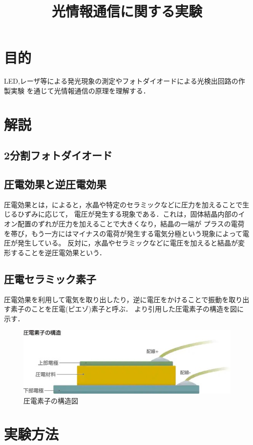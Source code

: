 \documentclass{ltjsarticle}
\title{光情報通信に関する実験}
\begin{document}
\maketitle

\section{目的}
	LED,レーザ等による発光現象の測定やフォトダイオードによる光検出回路の作製実験
	を通じて光情報通信の原理を理解する．

\section{解説}
	\subsection{2分割フォトダイオード}
	\subsection{圧電効果と逆圧電効果}
		圧電効果とは，\cite{ref:圧電効果}によると，水晶や特定のセラミックなどに圧力を加えることで生じるひずみに応じて，
		電圧が発生する現象である．これは，固体結晶内部のイオン配置のずれが圧力を加えることで大きくなり，結晶の一端が
		プラスの電荷を帯び，もう一方にはマイナスの電荷が発生する電気分極という現象によって電圧が発生している。
		反対に，水晶やセラミックなどに電圧を加えると結晶が変形することを逆圧電効果という．
	\subsection{圧電セラミック素子}
		圧電効果を利用して電気を取り出したり，逆に電圧をかけることで振動を取り出す素子のことを圧電(ピエゾ)素子と呼ぶ．
		\cite{ref:圧電効果}より引用した圧電素子の構造を図に示す．
		\begin{figure}[H]
		\centering
		\includegraphics[width = 12cm]{figs/kl080302u.jpg}
		\caption{圧電素子の構造図}
		\label{fig:圧電素子}
		\end{figure}
\section{実験方法}
\end{document}
